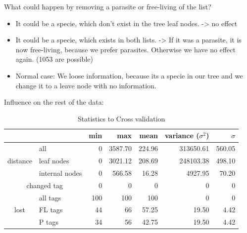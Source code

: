       What could happen by removing a parasite or free-living of the list?
      \begin{itemize}
        \item It could be a specie, which don't exist in the tree leaf nodes. -> no effect
        \item It could be a specie, which exists in both lists. -> If it was a parasite, it is now 
          free-living, because we prefer parasites. Otherwise we have no effect again. (1053 are possible)
        \item Normal case: We loose information, because its a specie in our tree and we change it to a 
          leave node with no information.
      \end{itemize}

      Influence on the rest of the data:
      \begin{table}
        \begin{center}
          \begin{tabular}{ |cl||r|r|r|r|r| }
            \hline
            & & min & max & mean & variance ($\sigma^2$) & $\sigma$ \\
            \hline \hline
            \multirow{3}{*}{distance} & all   & 0 & 3587.70 & 224.96 & 313650.61 & 560.05 \\
            & leaf nodes                      & 0 & 3021.12 & 208.69 & 248103.38 & 498.10 \\
            & internal nodes                  & 0 & 566.58 & 16.28 & 4927.95 & 70.20 \\ \hline
            \multicolumn{2}{|c||}{changed tag} & 0 & 0 & 0 & 0 & 0 \\ \hline
            \multirow{3}{*}{lost} & all tags  & 100 & 100 & 100 & 0 & 0 \\
            & FL tags                         & 44 & 66 & 57.25 & 19.50 & 4.42 \\
            & P tags                          & 34 & 56 & 42.75 & 19.50 & 4.42 \\
            \hline
          \end{tabular}
        \end{center}
        \caption{Statistics to Cross validation}
      \end{table}

